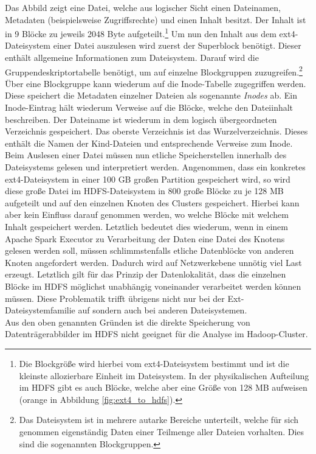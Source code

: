 \noindent
Das Abbild zeigt eine Datei, welche aus logischer Sicht einen Dateinamen, Metadaten (beispielsweise Zugriffsrechte) und einen Inhalt besitzt. Der Inhalt ist in 9 Blöcke zu jeweils 2048 Byte aufgeteilt.\footnote{Die Blockgröße wird hierbei vom ext4-Dateisystem bestimmt und ist die kleinste allozierbare Einheit im Dateisystem. In der physikalischen Aufteilung im HDFS gibt es auch Blöcke, welche aber eine Größe von 128 MB aufweisen (orange in Abbildung \ref{fig:ext4_to_hdfs}).} Um nun den Inhalt aus dem ext4-Dateisystem einer Datei auszulesen wird zuerst der Superblock benötigt. 
Dieser enthält allgemeine Informationen zum Dateisystem. Darauf wird die Gruppendeskriptortabelle benötigt, um auf einzelne Blockgruppen zuzugreifen.\footnote{Das Dateisystem ist in mehrere autarke Bereiche unterteilt, welche für sich genommen eigenständig Daten einer Teilmenge aller Dateien vorhalten. Dies sind die sogenannten Blockgruppen.} Über eine Blockgruppe kann wiederum auf die Inode-Tabelle zugegriffen werden. 
Diese speichert die Metadaten einzelner Dateien als sogenannte \textit{Inodes} ab. Ein Inode-Eintrag hält wiederum Verweise auf die Blöcke, welche den Dateiinhalt beschreiben. Der Dateiname ist wiederum in dem logisch übergeordneten Verzeichnis gespeichert. Das oberste Verzeichnis ist das Wurzelverzeichnis. Dieses enthält die Namen der Kind-Dateien und entsprechende Verweise zum Inode.\\
Beim Auslesen einer Datei müssen nun etliche Speicherstellen innerhalb des Dateisystems gelesen und interpretiert werden. Angenommen, dass ein konkretes ext4-Dateisystem in einer 100 GB großen Partition gespeichert wird, so wird diese große Datei im HDFS-Dateisystem in 800 große Blöcke zu je 128 MB aufgeteilt und auf den einzelnen Knoten des Clusters gespeichert. 
Hierbei kann aber kein Einfluss darauf genommen werden, wo welche Blöcke mit welchem Inhalt gespeichert werden. Letztlich bedeutet dies wiederum, wenn in einem Apache Spark Executor zu Verarbeitung der Daten eine Datei des Knotens gelesen werden soll, müssen schlimmstenfalls etliche Datenblöcke von anderen Knoten angefordert werden. Dadurch wird auf Netzwerkebene unnötig viel Last erzeugt. Letztlich gilt für das Prinzip der Datenlokalität, dass die einzelnen Blöcke im HDFS möglichst unabhängig voneinander verarbeitet werden können müssen. Diese Problematik trifft übrigens nicht nur bei der Ext-Dateisystemfamilie auf sondern auch bei anderen Dateisystemen.\\

\noindent
Aus den oben genannten Gründen ist die direkte Speicherung von Datenträgerabbilder im HDFS nicht geeignet für die Analyse im Hadoop-Cluster.

